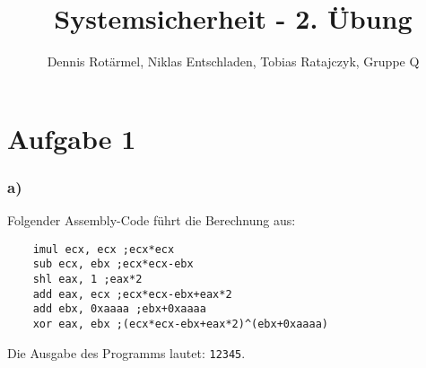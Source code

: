 \documentclass[]{scrreprt}
\title{Systemsicherheit - 2. Übung}
\author{Dennis Rotärmel, Niklas Entschladen, Tobias Ratajczyk, Gruppe Q}
\begin{document}
\maketitle
\chapter{Aufgabe 1}
\subsection*{a)}
Folgender Assembly-Code führt die Berechnung aus:
\begin{lstlisting}
	imul ecx, ecx ;ecx*ecx
	sub ecx, ebx ;ecx*ecx-ebx
	shl eax, 1 ;eax*2
	add eax, ecx ;ecx*ecx-ebx+eax*2
	add ebx, 0xaaaa ;ebx+0xaaaa
	xor eax, ebx ;(ecx*ecx-ebx+eax*2)^(ebx+0xaaaa)
\end{lstlisting}
Die Ausgabe des Programms lautet: \texttt{12345}.
\end{document}
